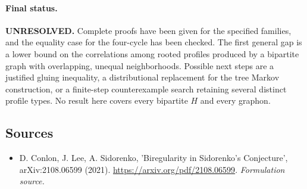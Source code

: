 \documentclass[11pt]{article}
\begin{document}
\paragraph{Final status.}
\textbf{UNRESOLVED.} Complete proofs have been given for the specified
families, and the equality case for the four-cycle has been checked.
The first general gap is a lower bound on the correlations among rooted
profiles produced by a bipartite graph with overlapping, unequal
neighborhoods. Possible next steps are a justified gluing inequality,
a distributional replacement for the tree Markov construction, or a
finite-step counterexample search retaining several distinct profile
types. No result here covers every bipartite $H$ and every graphon.

\subsection{Sources}
\begin{itemize}
\item[S1]D. Conlon, J. Lee, A. Sidorenko, 'Biregularity in Sidorenko's Conjecture', arXiv:2108.06599 (2021).
\url{https://arxiv.org/pdf/2108.06599}.
\textit{Formulation source.}
\end{itemize}
\end{document}
